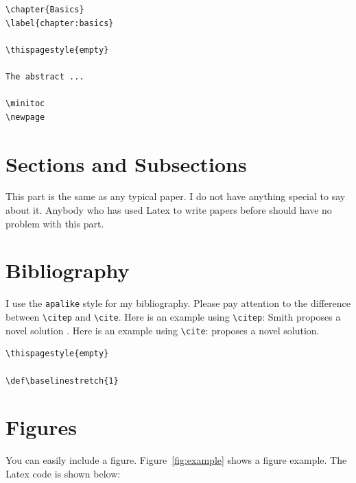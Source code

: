 \begin{lstlisting}
\chapter{Basics}
\label{chapter:basics}

\thispagestyle{empty}

The abstract ...

\minitoc
\newpage
\end{lstlisting}



\section{Sections and Subsections} 

This part is the same as any typical paper. I do not have anything special
to say about it. Anybody who has used Latex to write papers before should have no problem with 
this part.




\section{Bibliography}

I use the \texttt{apalike} style for my bibliography. 
Please pay attention to the difference between \texttt{\textbackslash citep} and
\texttt{\textbackslash cite}. Here is an example using \texttt{\textbackslash citep}:  
Smith proposes a novel solution \citep{smith19}. 
Here is an example using \texttt{\textbackslash cite}: 
\cite{smith19} proposes a novel solution.

\begin{lstlisting}
\thispagestyle{empty}

\def\baselinestretch{1}

\end{lstlisting}

\section{Figures}

You can easily include a figure. 
Figure~\ref{fig:example} shows a figure example. 
The Latex code is shown below: 

